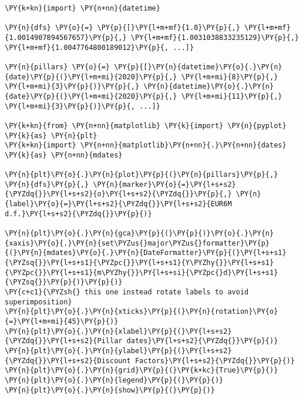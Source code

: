 \begin{Answer}
\begin{tcolorbox}[size=fbox, boxrule=1pt, colback=cellbackground, colframe=cellborder]
\begin{Verbatim}[commandchars=\\\{\}]
\PY{k+kn}{import} \PY{n+nn}{datetime}

\PY{n}{dfs} \PY{o}{=} \PY{p}{[}\PY{l+m+mf}{1.0}\PY{p}{,} \PY{l+m+mf}{1.0014907894567657}\PY{p}{,} \PY{l+m+mf}{1.0031038833235129}\PY{p}{,} \PY{l+m+mf}{1.0047764800189012}\PY{p}{, ...]}
       
\PY{n}{pillars} \PY{o}{=} \PY{p}{[}\PY{n}{datetime}\PY{o}{.}\PY{n}{date}\PY{p}{(}\PY{l+m+mi}{2020}\PY{p}{,} \PY{l+m+mi}{8}\PY{p}{,} \PY{l+m+mi}{3}\PY{p}{)}\PY{p}{,} \PY{n}{datetime}\PY{o}{.}\PY{n}{date}\PY{p}{(}\PY{l+m+mi}{2020}\PY{p}{,} \PY{l+m+mi}{11}\PY{p}{,} \PY{l+m+mi}{3}\PY{p}{)}\PY{p}{, ...]}

\PY{k+kn}{from} \PY{n+nn}{matplotlib} \PY{k}{import} \PY{n}{pyplot} \PY{k}{as} \PY{n}{plt}
\PY{k+kn}{import} \PY{n+nn}{matplotlib}\PY{n+nn}{.}\PY{n+nn}{dates} \PY{k}{as} \PY{n+nn}{mdates}

\PY{n}{plt}\PY{o}{.}\PY{n}{plot}\PY{p}{(}\PY{n}{pillars}\PY{p}{,} \PY{n}{dfs}\PY{p}{,} \PY{n}{marker}\PY{o}{=}\PY{l+s+s2}{\PYZdq{}}\PY{l+s+s2}{o}\PY{l+s+s2}{\PYZdq{}}\PY{p}{,} \PY{n}{label}\PY{o}{=}\PY{l+s+s2}{\PYZdq{}}\PY{l+s+s2}{EUR6M d.f.}\PY{l+s+s2}{\PYZdq{}}\PY{p}{)}

\PY{n}{plt}\PY{o}{.}\PY{n}{gca}\PY{p}{(}\PY{p}{)}\PY{o}{.}\PY{n}{xaxis}\PY{o}{.}\PY{n}{set\PYZus{}major\PYZus{}formatter}\PY{p}{(}\PY{n}{mdates}\PY{o}{.}\PY{n}{DateFormatter}\PY{p}{(}\PY{l+s+s1}{\PYZsq{}}\PY{l+s+s1}{\PYZpc{}}\PY{l+s+s1}{Y\PYZhy{}}\PY{l+s+s1}{\PYZpc{}}\PY{l+s+s1}{m\PYZhy{}}\PY{l+s+si}{\PYZpc{}d}\PY{l+s+s1}{\PYZsq{}}\PY{p}{)}\PY{p}{)}
\PY{c+c1}{\PYZsh{} this one instead rotate labels to avoid superimposition}
\PY{n}{plt}\PY{o}{.}\PY{n}{xticks}\PY{p}{(}\PY{n}{rotation}\PY{o}{=}\PY{l+m+mi}{45}\PY{p}{)}
\PY{n}{plt}\PY{o}{.}\PY{n}{xlabel}\PY{p}{(}\PY{l+s+s2}{\PYZdq{}}\PY{l+s+s2}{Pillar dates}\PY{l+s+s2}{\PYZdq{}}\PY{p}{)}
\PY{n}{plt}\PY{o}{.}\PY{n}{ylabel}\PY{p}{(}\PY{l+s+s2}{\PYZdq{}}\PY{l+s+s2}{Discount Factors}\PY{l+s+s2}{\PYZdq{}}\PY{p}{)}
\PY{n}{plt}\PY{o}{.}\PY{n}{grid}\PY{p}{(}\PY{k+kc}{True}\PY{p}{)}
\PY{n}{plt}\PY{o}{.}\PY{n}{legend}\PY{p}{(}\PY{p}{)}
\PY{n}{plt}\PY{o}{.}\PY{n}{show}\PY{p}{(}\PY{p}{)}
\end{Verbatim}
\end{tcolorbox}

\begin{center}
\end{center}
    { \hspace*{\fill} \\}
\end{Answer}
